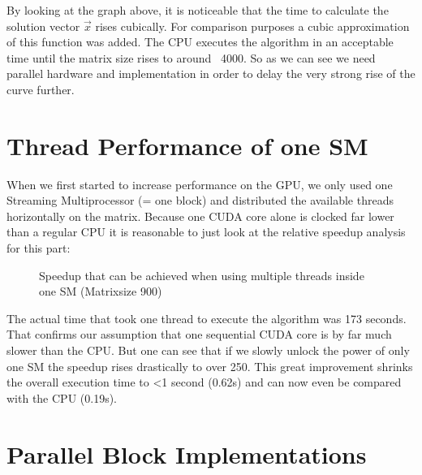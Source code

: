 \documentclass[draft, final]{vutinfth} %
\begin{document}
		By looking at the graph above, it is noticeable that the time to calculate the solution vector $\vec{x}$ rises cubically. For comparison purposes a cubic approximation of this function was added. The CPU executes the algorithm in an acceptable time until the matrix size rises to around ~4000. So as we can see we need parallel hardware and implementation in order to delay the very strong rise of the curve further.

	\section{Thread Performance of one SM}
	\label{sec:thread_performance_of_one_sm}
		When we first started to increase performance on the GPU, we only used one Streaming Multiprocessor (= one block) and distributed the available threads horizontally on the matrix. Because one CUDA core alone is clocked far lower than a regular CPU it is reasonable to just look at the relative speedup analysis for this part:

		\begin{figure}[!ht]
			\centering
			\begin{subfigure}[t]{2\textwidth}
			\end{subfigure}
			\caption{Speedup that can be achieved when using multiple threads inside one SM	(Matrixsize 900)}
		\end{figure}

		The actual time that took one thread to execute the algorithm was 173 seconds. That confirms our assumption that one sequential CUDA core is by far much slower than the CPU. But one can see that if we slowly unlock the power of only one SM the speedup rises drastically to over 250. This great improvement shrinks the overall execution time to <1 second (0.62s) and can now even be compared with the CPU (0.19s).

	\section{Parallel Block Implementations}
\end{document}
